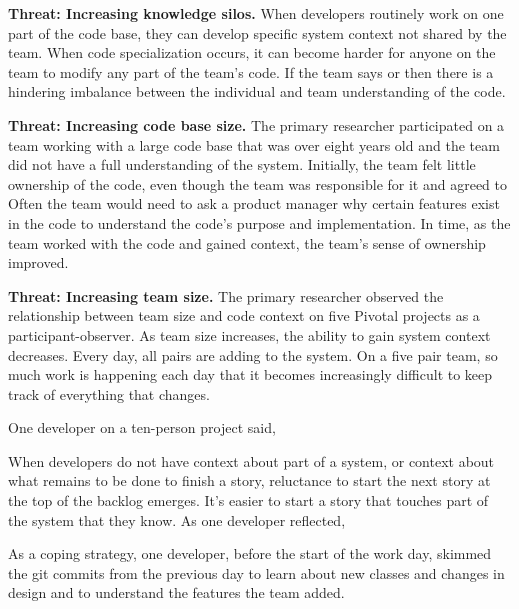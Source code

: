 \textbf{Threat: Increasing knowledge silos.} When developers routinely work on one part of the code base, they can develop specific system context not shared by the team. When code specialization occurs, it can become harder for anyone on the team to modify any part of the team's code.  If the team says  or  then there is a hindering imbalance between the individual and team understanding of the code.

\textbf{Threat: Increasing code base size.} The primary researcher participated on a team working with a large code base that was over eight years old and the team did not have a full understanding of the system. Initially, the team felt little ownership of the code, even though the team was responsible for it and agreed to  Often the team would need to ask a product manager why certain features exist in the code to understand the code's purpose and implementation. In time, as the team worked with the code and gained context, the team's sense of ownership improved.

\textbf{Threat: Increasing team size.} The primary researcher observed the relationship between team size and code context on five Pivotal projects as a participant-observer. As team size increases, the ability to gain system context decreases. Every day, all pairs are adding to the system. On a five pair team, so much work is happening each day that it becomes increasingly difficult to keep track of everything that changes.

One developer on a ten-person project said, 

When developers do not have context about part of a system, or context about what remains to be done to finish a story, reluctance to start the next story at the top of the backlog emerges. It's easier to start a story that touches part of the system that they know. As one developer reflected, 

As a coping strategy, one developer, before the start of the work day, skimmed the git commits from the previous day to learn about new classes and changes in design and to understand the features the team added. 

